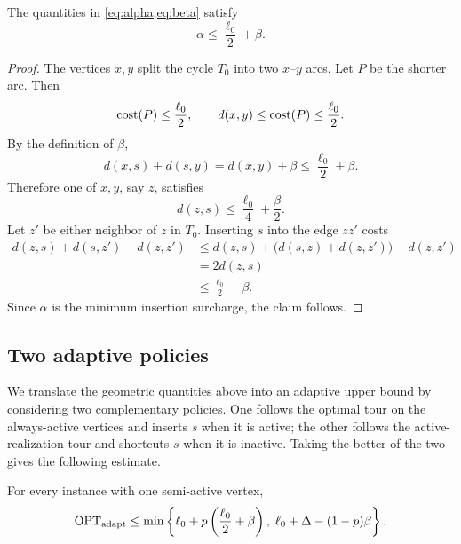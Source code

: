 \documentclass[12pt,a4paper,oneside]{report}
\begin{document}
\begin{lemma}\label{lem:exchange}
The quantities in \cref{eq:alpha,eq:beta} satisfy
\[
  \alpha\le\frac{\ell_0}{2}+\beta.
\]
\end{lemma}

\begin{proof}
The vertices $x,y$ split the cycle $T_0$ into two $x$--$y$ arcs.  Let $P$ be
the shorter arc.  Then
\[
  \operatorname{cost}(P)\le\frac{\ell_0}{2},
  \qquad
  d(x,y)\le\operatorname{cost}(P)\le\frac{\ell_0}{2}.
\]
By the definition of $\beta$,
\[
  d(x,s)+d(s,y)=d(x,y)+\beta\le\frac{\ell_0}{2}+\beta.
\]
Therefore one of $x,y$, say $z$, satisfies
\[
  d(z,s)\le\frac{\ell_0}{4}+\frac\beta2.
\]
Let $z'$ be either neighbor of $z$ in $T_0$.  Inserting $s$ into the edge
$zz'$ costs
\[
\begin{aligned}
  d(z,s)+d(s,z')-d(z,z')
  &\le d(z,s)+\bigl(d(s,z)+d(z,z')\bigr)-d(z,z')\\
  &=2d(z,s)\\
  &\le\frac{\ell_0}{2}+\beta.
\end{aligned}
\]
Since $\alpha$ is the minimum insertion surcharge, the claim follows.
\end{proof}

\subsection{Two adaptive policies}\label{sec:one-stochastic-policies}

We translate the geometric quantities above into an adaptive upper bound by
considering two complementary policies.  One follows the optimal tour on the
always-active vertices and inserts $s$ when it is active; the other follows
the active-realization tour and shortcuts $s$ when it is inactive.  Taking the
better of the two gives the following estimate.

\begin{lemma}\label{lem:two-policies}
For every instance with one semi-active vertex,
\begin{equation}\label{eq:two-policy-bound}
  \operatorname{OPT}_\mathrm{adapt}
  \le
  \min\left\{
    \ell_0+p\left(\frac{\ell_0}{2}+\beta\right),
    \;\ell_0+\Delta-(1-p)\beta
  \right\}.
\end{equation}
\end{lemma}
\end{document}
